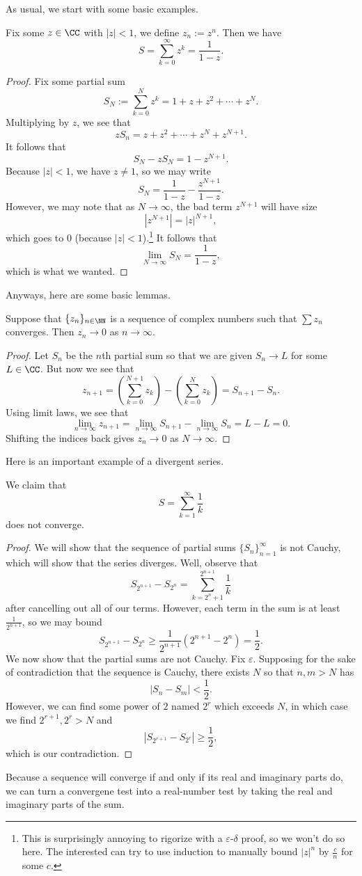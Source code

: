 As usual, we start with some basic examples.
\begin{exe}
	Fix some $z\in\CC$ with $|z|<1$, we define $z_n:=z^n$. Then we have
	\[S=\sum_{k=0}^\infty z^k=\frac1{1-z}.\]
\end{exe}
\begin{proof}
	Fix some partial sum
	\[S_N:=\sum_{k=0}^Nz^k=1+z+z^2+\cdots+z^N.\]
	Multiplying by $z$, we see that
	\[zS_n=z+z^2+\cdots+ z^N+z^{N+1}.\]
	It follows that
	\[S_N-zS_N=1-z^{N+1}.\]
	Because $|z|<1$, we have $z\ne1$, so we may write
	\[S_N=\frac1{1-z}-\frac{z^{N+1}}{1-z}.\]
	However, we may note that as $N\to\infty$, the bad term $z^{N+1}$ will have size
	\[\left|z^{N+1}\right|=|z|^{N+1},\]
	which goes to $0$ (because $|z|<1$).\footnote{This is surprisingly annoying to rigorize with a $\varepsilon$-$\delta$ proof, so we won't do so here. The interested can try to use induction to manually bound $|z|^n$ by $\frac cn$ for some $c$.} It follows that
	\[\lim_{N\to\infty}S_N=\frac1{1-z},\]
	which is what we wanted.
\end{proof}
Anyways, here are some basic lemmas.
\begin{lemma}
	Suppose that $\{z_n\}_{n\in\NN}$ is a sequence of complex numbers such that $\sum z_n$ converges. Then $z_n\to0$ as $n\to\infty$.
\end{lemma}
\begin{proof}
	Let $S_n$ be the $n$th partial sum so that we are given $S_n\to L$ for some $L\in\CC$. But now we see that
	\[z_{n+1}=\left(\sum_{k=0}^{N+1}z_k\right)-\left(\sum_{k=0}^{N}z_k\right)=S_{n+1}-S_n.\]
	Using limit laws, we see that
	\[\lim_{n\to\infty}z_{n+1}=\lim_{n\to\infty}S_{n+1}-\lim_{n\to\infty}S_n=L-L=0.\]
	Shifting the indices back gives $z_n\to0$ as $N\to\infty$.
\end{proof}
Here is an important example of a divergent series.
\begin{exe}
	We claim that
	\[S=\sum_{k=1}^\infty\frac1k\]
	does not converge.
\end{exe}
\begin{proof}
	We will show that the sequence of partial sums $\{S_n\}_{n=1}^\infty$ is not Cauchy, which will show that the series diverges. Well, observe that
	\[S_{2^{n+1}}-S_{2^n}=\sum_{k=2^n+1}^{2^{n+1}}\frac1k\]
	after cancelling out all of our terms. However, each term in the sum is at least $\frac1{2^{n+1}}$, so we may bound
	\[S_{2^{n+1}}-S_{2^n}\ge\frac1{2^{n+1}}\left(2^{n+1}-2^n\right)=\frac12.\]
	We now show that the partial sums are not Cauchy. Fix $\varepsilon$. Supposing for the sake of contradiction that the sequence is Cauchy, there exists $N$ so that $n,m>N$ has
	\[|S_n-S_m|<\frac12.\]
	However, we can find some power of $2$ named $2^r$ which exceeds $N$, in which case we find $2^{r+1},2^r>N$ and
	\[|S_{2^{r+1}}-S_{2^r}|\ge\frac12,\]
	which is our contradiction.
\end{proof}
\begin{remark}
	Because a sequence will converge if and only if its real and imaginary parts do, we can turn a convergene test into a real-number test by taking the real and imaginary parts of the sum.
\end{remark}

